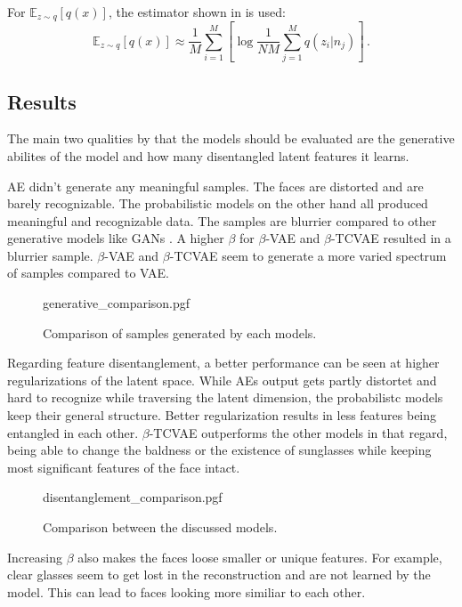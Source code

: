 \documentclass[a4paper]{IEEEtran}
\begin{document}
For $\mathbb{E}_{z \sim q}\left[ q(x) \right]$, the estimator shown in \cite{chen2019isolating} is used:
\begin{equation}
	\mathbb{E}_{z \sim q} \left[ q(x) \right] \approx \frac{1}{M} \sum_{i = 1}^{M} \left[ \log \frac{1}{NM} \sum_{j = 1}^{M}q(z_i|n_j) \right]\,.
\end{equation}


\subsection{Results}
The main two qualities by that the models should be evaluated are the generative abilites of the model and how many disentangled latent features it learns.

AE didn't generate any meaningful samples. The faces are distorted and are barely recognizable. The probabilistic models on the other hand all produced meaningful and recognizable data. The samples are blurrier compared to other generative models like GANs \cite{goodfellow2014generative}. A higher $\beta$ for $\beta$-VAE and $\beta$-TCVAE resulted in a blurrier sample. $\beta$-VAE and $\beta$-TCVAE seem to generate a more varied spectrum of samples compared to VAE.

\begin{figure}
	\centering
    {generative_comparison.pgf}
    \caption{Comparison of samples generated by each models.}
    \label{fig:generative}
\end{figure}

Regarding feature disentanglement, a better performance can be seen at higher regularizations of the latent space. While AEs output gets partly distortet and hard to recognize while traversing the latent dimension, the probabilistc models keep their general structure. Better regularization results in less features being entangled in each other. $\beta$-TCVAE outperforms the other models in that regard, being able to change the baldness or the existence of sunglasses while keeping most significant features of the face intact.

\begin{figure*}[h]
	\centering
    {disentanglement_comparison.pgf}
    \caption{Comparison between the discussed models.}
    \label{fig:disentanglement}
\end{figure*}

Increasing $\beta$ also makes the faces loose smaller or unique features. For example, clear glasses seem to get lost in the reconstruction and are not learned by the model. This can lead to faces looking more similiar to each other.
\end{document}
